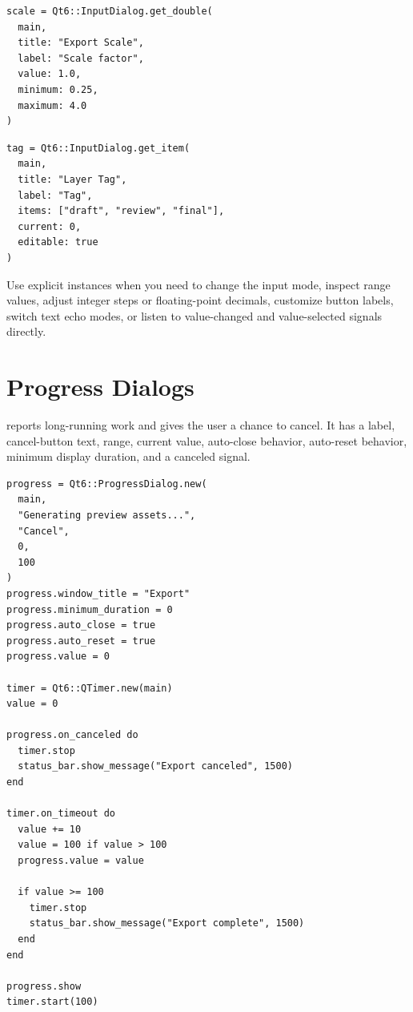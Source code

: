\begin{lstlisting}[style=crystal]
scale = Qt6::InputDialog.get_double(
  main,
  title: "Export Scale",
  label: "Scale factor",
  value: 1.0,
  minimum: 0.25,
  maximum: 4.0
)
\end{lstlisting}

\begin{lstlisting}[style=crystal]
tag = Qt6::InputDialog.get_item(
  main,
  title: "Layer Tag",
  label: "Tag",
  items: ["draft", "review", "final"],
  current: 0,
  editable: true
)
\end{lstlisting}


Use explicit  instances when you need to change the input mode, inspect range values, adjust integer steps or floating-point decimals, customize button labels, switch text echo modes, or listen to value-changed and value-selected signals directly.

\section{Progress Dialogs}

 reports long-running work and gives the user a chance to cancel. It has a label, cancel-button text, range, current value, auto-close behavior, auto-reset behavior, minimum display duration, and a canceled signal.


\begin{lstlisting}[style=crystal]
progress = Qt6::ProgressDialog.new(
  main,
  "Generating preview assets...",
  "Cancel",
  0,
  100
)
progress.window_title = "Export"
progress.minimum_duration = 0
progress.auto_close = true
progress.auto_reset = true
progress.value = 0

timer = Qt6::QTimer.new(main)
value = 0

progress.on_canceled do
  timer.stop
  status_bar.show_message("Export canceled", 1500)
end

timer.on_timeout do
  value += 10
  value = 100 if value > 100
  progress.value = value

  if value >= 100
    timer.stop
    status_bar.show_message("Export complete", 1500)
  end
end

progress.show
timer.start(100)
\end{lstlisting}

